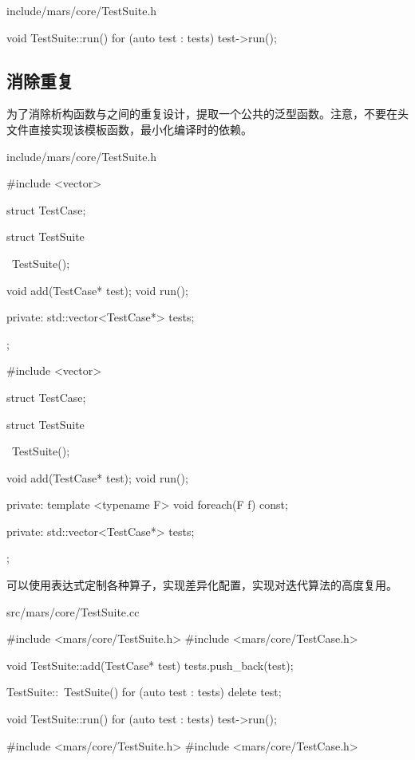\begin{content}
\begin{diff}{include/mars/core/TestSuite.h}
\begin{minicpp}
void TestSuite::run() {
  for (auto test : tests) {
    test->run();
  }
}
 \end{minicpp}
\end{diff}

\subsection{消除重复}

为了消除析构函数与之间的重复设计，提取一个公共的泛型函数。注意，不要在头文件直接实现该模板函数，最小化编译时的依赖。

\begin{diff}{include/mars/core/TestSuite.h}
 \begin{minicpp}
#include <vector>

struct TestCase;

struct TestSuite {
  ~TestSuite();

  void add(TestCase* test);
  void run();

private:
  std::vector<TestCase*> tests;
};
 \end{minicpp}
\tcblower
 \begin{minicpp}
#include <vector>

struct TestCase;

struct TestSuite {
  ~TestSuite();

  void add(TestCase* test);
  void run();

private:
  template <typename F>
  void foreach(F f) const;

private:
  std::vector<TestCase*> tests;
};
 \end{minicpp}
\end{diff}

可以使用表达式定制各种算子，实现差异化配置，实现对迭代算法的高度复用。

\begin{diff}{src/mars/core/TestSuite.cc}
 \begin{minicpp}
#include <mars/core/TestSuite.h>
#include <mars/core/TestCase.h>

void TestSuite::add(TestCase* test) {
  tests.push_back(test);
}

TestSuite::~TestSuite() {
  for (auto test : tests) {
    delete test;
  }
}

void TestSuite::run() {
  for (auto test : tests) {
    test->run();
  }
}
 \end{minicpp}
\tcblower
 \begin{minicpp}
#include <mars/core/TestSuite.h>
#include <mars/core/TestCase.h>


\end{minicpp}
\end{diff}
\end{content}
